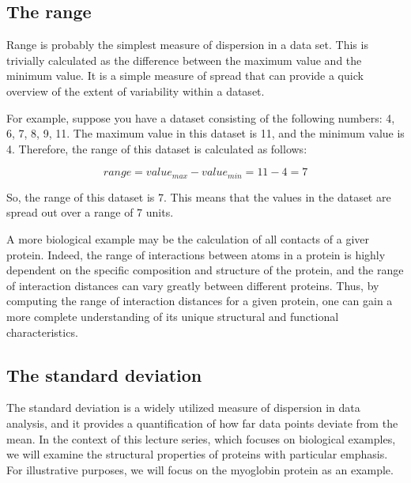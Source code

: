 \documentclass[
  letterpaper,
  DIV=11,
  numbers=noendperiod]{scrreprt}
\begin{document}
\hypertarget{the-range}{%
\subsection{The range}\label{the-range}}

Range is probably the simplest measure of dispersion in a data set. This
is trivially calculated as the difference between the maximum value and
the minimum value. It is a simple measure of spread that can provide a
quick overview of the extent of variability within a dataset.

For example, suppose you have a dataset consisting of the following
numbers: 4, 6, 7, 8, 9, 11. The maximum value in this dataset is 11, and
the minimum value is 4. Therefore, the range of this dataset is
calculated as follows:

\[
range = value_{max} - value_{min} = 11 - 4 = 7
\]

So, the range of this dataset is 7. This means that the values in the
dataset are spread out over a range of 7 units.

A more biological example may be the calculation of all contacts of a
giver protein. Indeed, the range of interactions between atoms in a
protein is highly dependent on the specific composition and structure of
the protein, and the range of interaction distances can vary greatly
between different proteins. Thus, by computing the range of interaction
distances for a given protein, one can gain a more complete
understanding of its unique structural and functional characteristics.

\hypertarget{the-standard-deviation}{%
\subsection{The standard deviation}\label{the-standard-deviation}}

The standard deviation is a widely utilized measure of dispersion in
data analysis, and it provides a quantification of how far data points
deviate from the mean. In the context of this lecture series, which
focuses on biological examples, we will examine the structural
properties of proteins with particular emphasis. For illustrative
purposes, we will focus on the myoglobin protein as an example.
\end{document}
